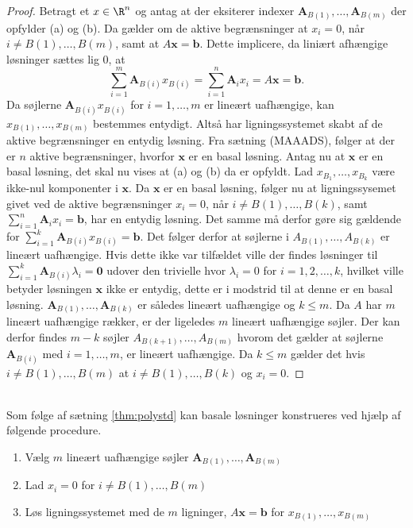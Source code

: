 \begin{proof}
Betragt et $x \in \R^n$ og antag at der eksiterer indexer $\mathbf{A}_{B(1)},\ldots,\mathbf{A}_{B(m)}$ der opfylder (a) og (b).
Da gælder om de aktive begrænsninger at $x_i=0$, når $i\neq B(1),\ldots,B(m)$, samt at $A\mathbf{x}=\mathbf{b}$.
Dette implicere, da liniært afhængige løsninger sættes lig $0$,  at 
%
$$\sum_{i=1}^{m}\textbf{A}_{B(i)}x_{B(i)}=\sum_{i=1}^{n}\textbf{A}_ix_i=A\textbf{x}=\textbf{b}.$$
%
Da søjlerne $\textbf{A}_{B(i)}x_{B(i)}$ for $i=1,\ldots,m$ er lineært uafhængige, kan $x_{B(1)},\ldots,x_{B(m)}$ bestemmes entydigt. 
Altså har ligningssystemet skabt af de aktive begrænsninger en entydig løsning.
Fra sætning (MAAADS), følger at der er $n$ aktive begrænsninger, hvorfor $\mathbf{x}$ er en basal løsning. 
Antag nu at $\mathbf{x}$ er en basal løsning, det skal nu vises at (a) og (b) da er opfyldt.
Lad $x_{B_1},\ldots,x_{B_k}$ være ikke-nul komponenter i $\textbf{x}$.
Da $\mathbf{x}$ er en basal løsning, følger nu at ligningssysemet givet ved de aktive begrænsninger $x_i=0$, når $i\neq B(1),\ldots,B(k)$, samt  $\sum_{i=1}^{n}\mathbf{A}_ix_i=\mathbf{b}$, har en entydig løsning. 
Det samme må derfor gøre sig gældende for $\sum_{i=1}^{k}\mathbf{A}_{B(i)}x_{B(i)}=\mathbf{b}$.
Det følger derfor at søjlerne i $A_{B(1)},\ldots,A_{B(k)}$ er lineært uafhængige.
Hvis dette ikke var tilfældet ville der findes løsninger til $\sum_{i=1}^{k}\mathbf{A}_{B(i)} \lambda_i=\mathbf{0}$ udover den trivielle hvor $\lambda_i=0$ for $i=1,2,\ldots,k$, hvilket ville betyder løsningen $\mathbf{x}$ ikke er entydig, dette er i modstrid til at denne er en basal løsning.
$\mathbf{A}_{B(1)},\ldots ,\mathbf{A}_{B(k)}$ er således lineært uafhængige og $k \leq m$.
Da $A$ har $m$ lineært uafhængige rækker, er der ligeledes $m$ lineært uafhængige søjler.
Der kan derfor findes $m-k$ søjler $A_{B(k+1)},\ldots,A_{B(m)}$ hvorom det gælder at søjlerne $\mathbf{A}_{B(i)}$ med $i=1,\ldots,m$, er lineært uafhængige.
Da $k \leq m$ gælder det hvis $i \neq B(1),\ldots,B(m)$ at $i \neq B(1),\ldots,B(k)$ og $x_i=0$.
\end{proof}
\\
\noindent
Som følge af sætning \ref{thm:polystd} kan basale løsninger konstrueres ved hjælp af følgende procedure.
\begin{enumerate}
\item Vælg $m$ lineært uafhængige søjler $\textbf{A}_{B(1)},\ldots,\textbf{A}_{B(m)}$
\item Lad $x_i=0$ for $i \neq B(1),\ldots,B(m)$
\item Løs ligningssystemet med de $m$ ligninger, $A\textbf{x}=\textbf{b}$ for $x_{B(1)}, \ldots , x_{B(m)} $
\end{enumerate}
